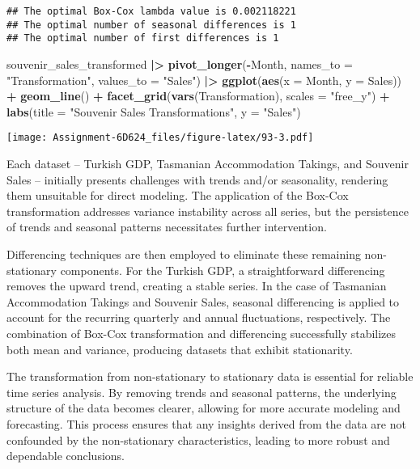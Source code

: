 \documentclass[
]{article}
\newenvironment{Shaded}{\begin{snugshade}}{\end{snugshade}}
\newcommand{\AttributeTok}[1]{\textcolor[rgb]{0.13,0.29,0.53}{#1}}
\newcommand{\FunctionTok}[1]{\textcolor[rgb]{0.13,0.29,0.53}{\textbf{#1}}}
\newcommand{\NormalTok}[1]{#1}
\newcommand{\SpecialCharTok}[1]{\textcolor[rgb]{0.81,0.36,0.00}{\textbf{#1}}}
\newcommand{\StringTok}[1]{\textcolor[rgb]{0.31,0.60,0.02}{#1}}
\begin{document}
\begin{verbatim}
## The optimal Box-Cox lambda value is 0.002118221 
## The optimal number of seasonal differences is 1 
## The optimal number of first differences is 1
\end{verbatim}

\begin{Shaded}
\begin{Highlighting}[]
\NormalTok{souvenir\_sales\_transformed }\SpecialCharTok{|\textgreater{}} 
  \FunctionTok{pivot\_longer}\NormalTok{(}\SpecialCharTok{{-}}\NormalTok{Month, }\AttributeTok{names\_to =} \StringTok{"Transformation"}\NormalTok{, }\AttributeTok{values\_to =} \StringTok{"Sales"}\NormalTok{) }\SpecialCharTok{|\textgreater{}} 
  \FunctionTok{ggplot}\NormalTok{(}\FunctionTok{aes}\NormalTok{(}\AttributeTok{x =}\NormalTok{ Month, }\AttributeTok{y =}\NormalTok{ Sales)) }\SpecialCharTok{+}
  \FunctionTok{geom\_line}\NormalTok{() }\SpecialCharTok{+}
  \FunctionTok{facet\_grid}\NormalTok{(}\FunctionTok{vars}\NormalTok{(Transformation), }\AttributeTok{scales =} \StringTok{"free\_y"}\NormalTok{) }\SpecialCharTok{+}
  \FunctionTok{labs}\NormalTok{(}\AttributeTok{title =} \StringTok{"Souvenir Sales Transformations"}\NormalTok{, }\AttributeTok{y =} \StringTok{"Sales"}\NormalTok{)}
\end{Highlighting}
\end{Shaded}

\texttt{[image: Assignment-6D624\_files/figure-latex/93-3.pdf]}

Each dataset -- Turkish GDP, Tasmanian Accommodation Takings, and
Souvenir Sales -- initially presents challenges with trends and/or
seasonality, rendering them unsuitable for direct modeling. The
application of the Box-Cox transformation addresses variance instability
across all series, but the persistence of trends and seasonal patterns
necessitates further intervention.

Differencing techniques are then employed to eliminate these remaining
non-stationary components. For the Turkish GDP, a straightforward
differencing removes the upward trend, creating a stable series. In the
case of Tasmanian Accommodation Takings and Souvenir Sales, seasonal
differencing is applied to account for the recurring quarterly and
annual fluctuations, respectively. The combination of Box-Cox
transformation and differencing successfully stabilizes both mean and
variance, producing datasets that exhibit stationarity.

The transformation from non-stationary to stationary data is essential
for reliable time series analysis. By removing trends and seasonal
patterns, the underlying structure of the data becomes clearer, allowing
for more accurate modeling and forecasting. This process ensures that
any insights derived from the data are not confounded by the
non-stationary characteristics, leading to more robust and dependable
conclusions.
\end{document}
